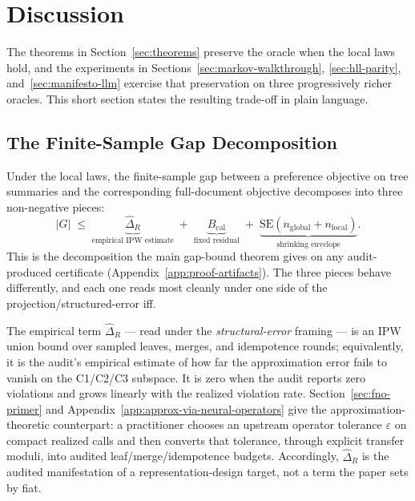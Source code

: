 \section{Discussion}\label{sec:discussion}

The theorems in Section~\ref{sec:theorems} preserve the oracle when the local laws hold, and the experiments in Sections~\ref{sec:markov-walkthrough}, \ref{sec:hll-parity}, and~\ref{sec:manifesto-llm} exercise that preservation on three progressively richer oracles. This short section states the resulting trade-off in plain language.

\subsection{The Finite-Sample Gap Decomposition}\label{sec:discussion-tradeoff}

Under the local laws, the finite-sample gap between a preference
objective on tree summaries and the corresponding full-document
objective decomposes into three non-negative pieces:
\begin{equation}\label{eq:discussion-bound}
|G|
\;\le\;
\underbrace{\hat{\Delta}_R}_{\text{empirical IPW estimate}}
\;+\;
\underbrace{B_{\mathrm{cal}}}_{\text{fixed residual}}
\;+\;
\underbrace{\text{SE}(n_{\mathrm{global}} + n_{\mathrm{local}})}_{\text{shrinking envelope}}.
\end{equation}
This is the decomposition the main gap-bound theorem gives on any audit-produced certificate (Appendix~\ref{app:proof-artifacts}). The three pieces behave differently, and each one reads most cleanly under one side of the projection/structured-error iff.

The empirical term $\hat{\Delta}_R$ --- read under the \emph{structural-error} framing --- is an IPW union bound over sampled leaves, merges, and idempotence rounds; equivalently, it is the audit's empirical estimate of how far the approximation error fails to vanish on the C1/C2/C3 subspace. It is zero when the audit reports zero violations and grows linearly with the realized violation rate. Section~\ref{sec:fno-primer} and Appendix~\ref{app:approx-via-neural-operators} give the approximation-theoretic counterpart: a practitioner chooses an upstream operator tolerance $\varepsilon$ on compact realized calls and then converts that tolerance, through explicit transfer moduli, into audited leaf/merge/idempotence budgets. Accordingly, $\hat{\Delta}_R$ is the audited manifestation of a representation-design target, not a term the paper sets by fiat.

